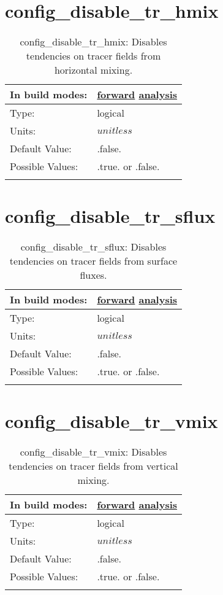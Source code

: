 \section[config\_disable\_tr\_hmix]{config\_disable\_tr\_hmix}
\label{sec:nm_sec_config_disable_tr_hmix}
\begin{center}
\begin{longtable}{| p{2.0in} || p{4.0in} |}
    \hline
    In build modes: & \hyperref[subsec:forward_nm_tab_debug]{forward} \hyperref[subsec:analysis_nm_tab_debug]{analysis} \\
    \hline
    Type: & logical \\
    \hline
    Units: & $unitless$ \\
    \hline
    Default Value: & .false. \\
    \hline
    Possible Values: & .true. or .false. \\
    \hline
    \caption{config\_disable\_tr\_hmix: Disables tendencies on tracer fields from horizontal mixing.}
\end{longtable}
\end{center}
\section[config\_disable\_tr\_sflux]{config\_disable\_tr\_sflux}
\label{sec:nm_sec_config_disable_tr_sflux}
\begin{center}
\begin{longtable}{| p{2.0in} || p{4.0in} |}
    \hline
    In build modes: & \hyperref[subsec:forward_nm_tab_debug]{forward} \hyperref[subsec:analysis_nm_tab_debug]{analysis} \\
    \hline
    Type: & logical \\
    \hline
    Units: & $unitless$ \\
    \hline
    Default Value: & .false. \\
    \hline
    Possible Values: & .true. or .false. \\
    \hline
    \caption{config\_disable\_tr\_sflux: Disables tendencies on tracer fields from surface fluxes.}
\end{longtable}
\end{center}
\section[config\_disable\_tr\_vmix]{config\_disable\_tr\_vmix}
\label{sec:nm_sec_config_disable_tr_vmix}
\begin{center}
\begin{longtable}{| p{2.0in} || p{4.0in} |}
    \hline
    In build modes: & \hyperref[subsec:forward_nm_tab_debug]{forward} \hyperref[subsec:analysis_nm_tab_debug]{analysis} \\
    \hline
    Type: & logical \\
    \hline
    Units: & $unitless$ \\
    \hline
    Default Value: & .false. \\
    \hline
    Possible Values: & .true. or .false. \\
    \hline
    \caption{config\_disable\_tr\_vmix: Disables tendencies on tracer fields from vertical mixing.}
\end{longtable}
\end{center}

